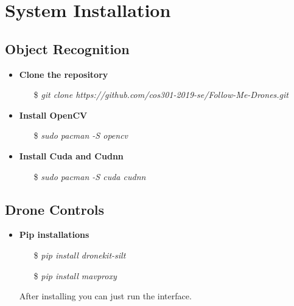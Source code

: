 \chapter{System Installation}

\section{Object Recognition}
\begin{itemize}
    \item \textbf{Clone the repository}
        \begin{itemize}
            \item[\$] \textit{git clone https://github.com/cos301-2019-se/Follow-Me-Drones.git}
        \end{itemize}
    \item \textbf{Install OpenCV}
        \begin{itemize}
            \item[\$] \textit{sudo pacman -S opencv}
        \end{itemize}
    \item \textbf{Install Cuda and Cudnn}
        \begin{itemize}
            \item[\$] \textit{sudo pacman -S cuda cudnn}
        \end{itemize}
\end{itemize}

\section{Drone Controls}

\begin{itemize}
    \item \textbf{Pip installations}
        \begin{itemize}
            \item[\$] \textit{pip install dronekit-silt}
            \item[\$] \textit{pip install mavproxy} 
        \end{itemize}
        After installing you can just run the interface.
\end{itemize}
